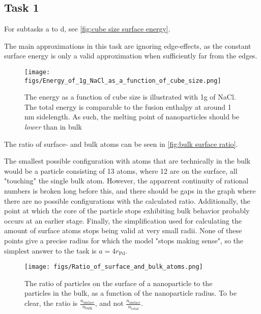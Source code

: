 







\subsection*{Task 1}

    For subtasks a to d, see \autoref{fig:cube size surface energy}.

    The main approximations in this task are ignoring edge-effects, as the 
    constant surface energy is only a valid approximation when sufficiently far from the edges.

    \begin{figure}[bh]
        \texttt{[image: figs/Energy\_of\_1g\_NaCl\_as\_a\_function\_of\_cube\_size.png]}

        \caption{The energy as a function of cube size is 
        illustrated with 1g of NaCl. 
        The total energy is comparable to the fusion enthalpy at 
        around 1 nm sidelength. 
        As such, the melting point of nanoparticles should be 
        \textit{lower} than in bulk}
        \label{fig:cube size surface energy}
    \end{figure}

    The ratio of surface- and bulk atoms can be seen in \autoref{fig:bulk surface ratio}.

    The smallest possible configuration with atoms that are technically in the bulk
    would be a particle consisting of 13 atoms, where 12 are on the surface, 
    all "touching" the single bulk atom. 
    However, the apparrent continuity of rational numbers is 
    broken long before this, and there should be gaps in the graph
    where there are no possible configurations with the calculated ratio.
    Additionally, the point at which the core of the particle stops
    exhibiting bulk behavior probably occurs at an earlier stage. 
    Finally, the simplification used for calculating the amount of
    surface atoms stops being valid at very small radii. 
    None of these points give a precise radius for which the model
    "stops making sense", so the simplest answer to the task is $a = 4r_{\text{Pd}}$.

    \begin{figure}[h]
        \texttt{[image: figs/Ratio\_of\_surface\_and\_bulk\_atoms.png]}

        \caption{The ratio of particles on the surface of a nanoparticle
        to the particles in the bulk, as a function of the nanoparticle radius.
        To be clear, the ratio is $\frac{n_\text{surface}}{n_\text{bulk}}$, 
        and not $\frac{n_\text{surface}}{n_\text{total}}$.
        }
        \label{fig:bulk surface ratio}
    \end{figure}

